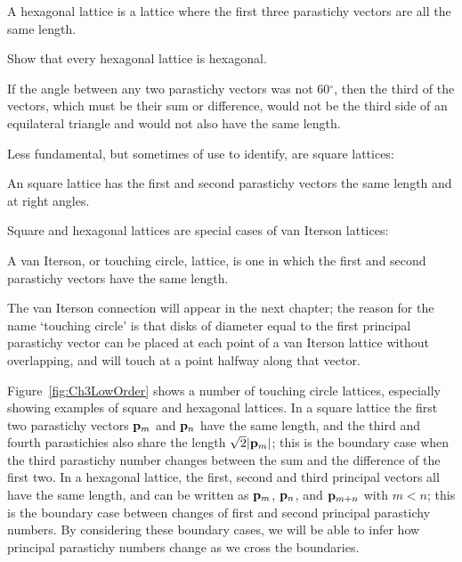 \begin{definition}
	A hexagonal lattice is a lattice where the first three parastichy vectors are all the same length. 
\end{definition}
\begin{jExercise}
	Show that every hexagonal lattice is hexagonal.
\end{jExercise}
\begin{jAnswer}
	If the angle between any two parastichy vectors was not 60$^\circ$, then the third of the vectors, which must be their sum or difference, would not be the third side of an equilateral triangle and would not also have the same length.
\end{jAnswer}
Less fundamental, but sometimes of use to identify, are square lattices:
\begin{definition}
	An square lattice has the first and second parastichy vectors the same length and at right angles. 
\end{definition}
Square and hexagonal lattices are special cases of van Iterson lattices:
\begin{definition}
	A van Iterson, or touching circle, lattice, is one in which the first and second parastichy vectors have the same length.
\end{definition}
\clearpage
The van Iterson connection will appear in the next chapter; the reason for the name `touching circle' is that disks of diameter equal to the first principal parastichy vector can be placed at each point of a van Iterson lattice without overlapping, and will touch at a point halfway along that vector. 


Figure~\ref{fig:Ch3LowOrder} shows a number of touching circle lattices, especially showing examples of square and hexagonal lattices. 
%
In a square lattice the first two parastichy vectors ${\mathbf p}_{m}$ and ${\mathbf p}_{n}$ have the same length, and the third and fourth parastichies also share the length $\sqrt{2}|{\mathbf p}_{m}|$; this is the boundary case when the third parastichy number changes between the sum and the difference of the first two. In a hexagonal lattice, the  first,  second and third principal  vectors all have the same length, and can be written as ${\mathbf p}_{m}$, ${\mathbf p}_{n}$, and ${\mathbf p}_{m+n}$ with $m<n$; this is the boundary case between changes of first and second principal parastichy numbers. 
By considering these boundary cases, we will be able to  infer how principal parastichy numbers change as we cross the boundaries.  



